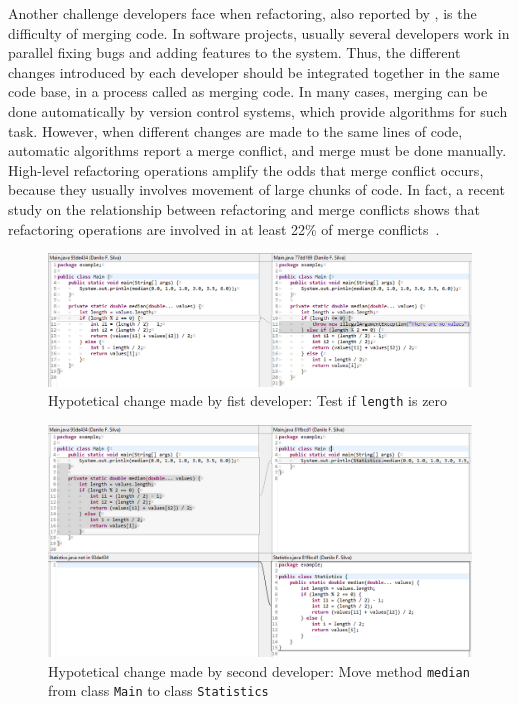 Another challenge developers face when refactoring, also reported by \cite{kim-tse-2014}, is the difficulty of merging code.
In software projects, usually several developers work in parallel fixing bugs and adding features to the system.
Thus, the different changes introduced by each developer should be integrated together in the same code base, in a process called as merging code.
In many cases, merging can be done automatically by version control systems, which provide algorithms for such task.
However, when different changes are made to the same lines of code, automatic algorithms report a merge conflict, and merge must be done manually.
High-level refactoring operations amplify the odds that merge conflict occurs, because they usually involves movement of large chunks of code.
In fact, a recent study on the relationship between refactoring and merge conflicts shows that refactoring operations are involved in at least 22\% of merge conflicts~\citep{mahmoudi2019refactorings}.

\begin{figure}[htbp]
\centering
\includegraphics[width=\linewidth]{img/merge-ex-diff1.png}
\caption{Hypotetical change made by fist developer: Test if \texttt{length} is zero}
\label{FigMergeExDiff1}
\end{figure}

\begin{figure}[htbp]
\centering
\includegraphics[width=\linewidth]{img/merge-ex-diff2.png}
\caption{Hypotetical change made by second developer: Move method \texttt{median} from class \texttt{Main} to class \texttt{Statistics}}
\label{FigMergeExDiff2}
\end{figure}

